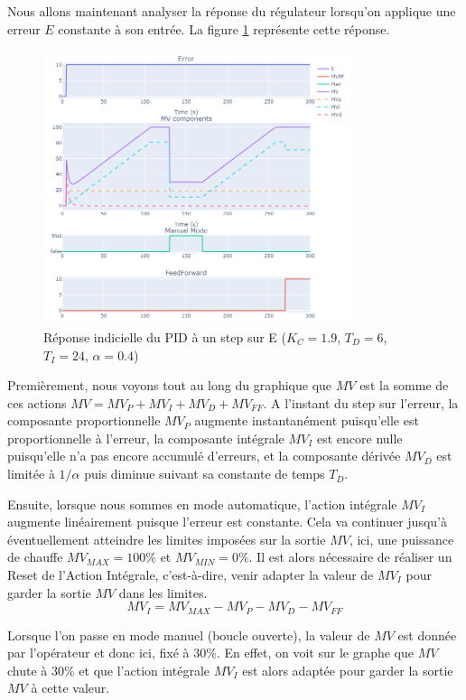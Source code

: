 Nous allons maintenant analyser la réponse du régulateur lorsqu'on applique une erreur $E$ constante à son entrée.
La figure \ref{fig:Step_Response_PID} représente cette réponse.
\begin{figure}[h]
    \centering
    \includegraphics[width=0.8\textwidth]{../Plots/PID/PID_Response_error_step.png}
    \caption{Réponse indicielle du PID à un step sur E ($K_C = 1.9$, $T_D = 6$, $T_I = 24$, $\alpha = 0.4$)}
    \label{fig:Step_Response_PID}
\end{figure}
Premièrement, nous voyons tout au long du graphique que $MV$ est la somme de ces actions $MV = MV_P + MV_I + MV_D + MV_{FF}$.
A l'instant du step sur l'erreur, la composante proportionnelle $MV_P$ augmente instantanément puisqu'elle est proportionnelle à l'erreur, la composante intégrale $MV_I$ est encore nulle puisqu'elle n'a pas encore accumulé d'erreurs, et la composante dérivée $MV_D$ est limitée à $1/\alpha$ puis diminue suivant sa constante de temps $T_D$.

Ensuite, lorsque nous sommes en mode automatique, l'action intégrale $MV_I$ augmente linéairement puisque l'erreur est constante.
Cela va continuer jusqu'à éventuellement atteindre les limites imposées sur la sortie $MV$, ici, une puissance de chauffe $MV_{MAX} = 100\%$ et $MV_{MIN} = 0\%$.
Il est alors nécessaire de réaliser un Reset de l'Action Intégrale, c'est-à-dire, venir adapter la valeur de $MV_I$ pour garder la sortie $MV$ dans les limites.
\begin{equation*}
    MV_I = MV_{MAX} - MV_P - MV_D - MV_{FF}
\end{equation*}

Lorsque l'on passe en mode manuel (boucle ouverte), la valeur de $MV$ est donnée par l'opérateur et donc ici, fixé à 30\%.
En effet, on voit sur le graphe que $MV$ chute à 30\% et que l'action intégrale $MV_I$ est alors adaptée pour garder la sortie $MV$ à cette valeur.

